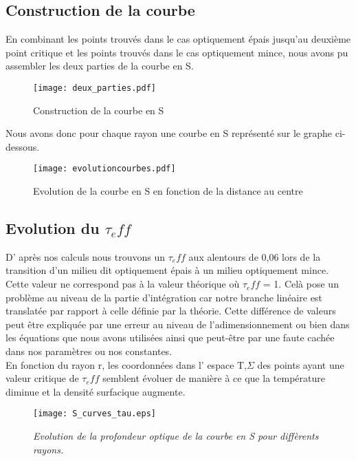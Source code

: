 \subsection{Construction de la courbe}

En combinant les points trouvés dans le cas optiquement épais jusqu'au deuxième point critique et les points trouvés dans le cas optiquement mince, nous avons pu assembler les deux parties de la courbe en S. 

\begin{figure}[htb!]
	\centering
	\texttt{[image: deux\_parties.pdf]}
	\caption{Construction de la courbe en S}
	\label{Fig::bench}
\end{figure}


Nous avons donc pour chaque rayon une courbe en S représenté sur le graphe ci-dessous.
\begin{figure}[htb!]
	\centering
	\texttt{[image: evolutioncourbes.pdf]}
	\caption{Evolution de la courbe en S en fonction de la distance au centre}
	\label{Fig::bench}
\end{figure}



\subsection{Evolution du $\tau_eff$}

D' après nos calculs nous trouvons un $\tau_eff$ aux alentours de 0,06 lors de la transition d'un milieu dit optiquement épais à un milieu optiquement mince. Cette valeur ne correspond pas à la valeur théorique où $\tau_eff$ = 1. 
Celà pose un problème au niveau de la partie d'intégration car notre branche linéaire est translatée par rapport à celle définie par la théorie. 
Cette différence de valeurs peut être expliquée par une erreur au niveau de l’adimensionnement ou bien dans les équations que nous avons utilisées ainsi que peut-être par une faute cachée dans nos paramètres ou nos constantes. 
\\
En fonction du rayon r, les coordonnées dans l' espace {T,$\Sigma$} des points ayant une valeur critique de $\tau_eff$ semblent évoluer de manière à ce que la température diminue et la densité surfacique augmente.

\begin{figure}[htb!]
	\centering
	\texttt{[image: S\_curves\_tau.eps]}
	\caption{\textit{Evolution de la profondeur optique de la courbe en S pour diffèrents rayons.}  }
	\label{Fig::bench}
\end{figure}

